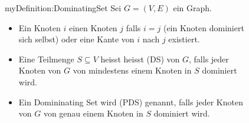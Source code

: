 \begin{frame}[label=repetition]
\begin{figure}[fragile]
\begin{myDefinition}{myDefinition:DominatingSet}
Sei $G = (V, E)$ ein Graph.
\begin{itemize}
    \item Ein Knoten $i$  einen Knoten $j$ falls $i = j$ (ein Knoten dominiert sich selbst) oder eine Kante von $i$ nach $j$ existiert.
    \item Eine Teilmenge $S\subseteq V$ heisst heisst  (DS) von $G$, falls jeder Knoten von $G$ von mindestens einem Knoten in $S$ dominiert wird.
    \item Ein Domininating Set wird  (PDS) genannt, falls jeder Knoten von $G$ von genau einem Knoten in $S$ dominiert wird.
\end{itemize}
\end{myDefinition}
\end{figure}
\end{frame}


